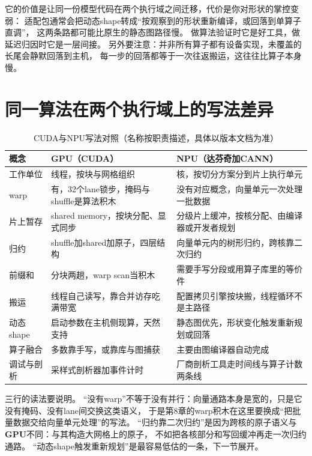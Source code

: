 \documentclass[12pt,a4paper,fontset=fandol]{ctexbook}
\newcommand{\Dom}[1]{\textsf{\bfseries #1}}
\newcommand{\GPU}{\Dom{GPU}}
\newcommand{\NPU}{\Dom{NPU}}
\begin{document}
它的价值是让同一份模型代码在两个执行域之间迁移，代价是你对形状的掌控变弱：
适配包通常会把动态shape转成``按观察到的形状重新编译，或回落到单算子直调''，
这两条路都可能比原生的静态图路径慢。
做算法验证时它是好工具，做延迟归因时它是一层间接。
另外要注意：并非所有算子都有设备实现，未覆盖的长尾会静默回落到主机，
每一步的回落都等于一次往返搬运，这往往比算子本身慢。

\section{同一算法在两个执行域上的写法差异}

\begin{table}[H]
\centering
\caption{CUDA与NPU写法对照（名称按职责描述，具体以版本文档为准）}
\begin{tabular}{@{}>{\raggedright\arraybackslash}p{}
  >{\raggedright\arraybackslash}p{}
  >{\raggedright\arraybackslash}p{}@{}}
\toprule
概念 & \GPU{}（CUDA） & \NPU{}（达芬奇加CANN） \\
\midrule
工作单位 & 线程，按块与网格组织 & 核，按切分方案分到片上执行单元 \\
warp & 有，32个lane锁步，掩码与shuffle是算法积木 & 没有对应概念，向量单元一次处理一批数据 \\
片上暂存 & shared memory，按块分配、显式同步 & 分级片上缓冲，按核分配、由编译器或开发者规划 \\
归约 & shuffle加shared加原子，四层结构 & 向量单元内的树形归约，跨核靠二次归约 \\
前缀和 & 分块两趟，warp scan当积木 & 需要手写分段或用算子库里的等价件 \\
搬运 & 线程自己读写，靠合并访存吃满带宽 & 配置拷贝引擎按块搬，线程循环不是主路径 \\
动态shape & 启动参数在主机侧现算，天然支持 & 静态图优先，形状变化触发重新规划或回落 \\
算子融合 & 多数靠手写，或靠库与图捕获 & 主要由图编译器自动完成 \\
调试与剖析 & 采样式剖析器加事件计时 & 厂商剖析工具走时间线与算子计数两条线 \\
\bottomrule
\end{tabular}
\end{table}

三行的读法要说明。
``没有warp''不等于没有并行：向量通路本身是宽的，只是它没有掩码、没有lane间交换这类语义，
于是第8章的warp积木在这里要换成``把批量数据交给向量单元处理''的写法。
``归约靠二次归约''是因为跨核的原子语义与\GPU{}不同：与其构造大网格上的原子，
不如把各核部分和写回缓冲再走一次归约通路。
``动态shape触发重新规划''是最容易低估的一条，下一节展开。
\end{document}
